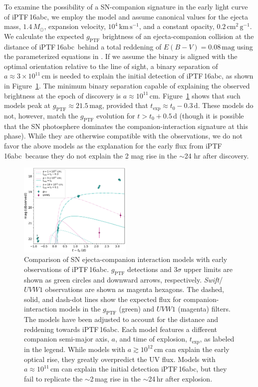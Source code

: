 \documentclass[twocolumn]{aastex61}
\newcommand{\sm}{M_\odot}
\newcommand{\abc}{iPTF\,16abc}
\begin{document}
To examine the possibility of a SN-companion signature in the early
light curve of \abc, we employ the \citet{2010ApJ...708.1025K}
model and assume canonical values for the ejecta mass, $1.4\,\sm$, expansion velocity, $10^{4}\,\textrm{km}\,\textrm{s}^{-1}$, and a constant opacity, $0.2\,\textrm{cm}^2\,\textrm{g}^{-1}$. We calculate the expected $g_\mathrm{PTF}$ brightness of an ejecta-companion collision at the distance of \abc\ behind a total reddening of $E(B-V) = 0.08 \, \mathrm{mag}$ using the parameterized equations in \citet{2012ApJ...749...18B}. If we assume the binary is aligned with the optimal orientation relative to the line of sight, a binary separation of $a \approx 3 \times 10^{11}\, \mathrm{cm}$ is needed to explain the initial detection of \abc, as shown in Figure~\ref{fig:SN-companion}.  The minimum binary separation capable of explaining the observed brightness at the epoch of discovery is $a \approx 10^{11} \, \mathrm{cm}$. Figure~\ref{fig:SN-companion} shows that such models peak at $g_\mathrm{PTF} \approx 21.5 \, \mathrm{mag}$, provided that $t_\mathrm{exp} \approx t_0 - 0.3 \, \mathrm{d}$. These models do not, however, match the $g_\mathrm{PTF}$ evolution for $t > t_0 + 0.5 \, \mathrm{d}$ (though it is possible that the SN photosphere dominates the companion-interaction signature at this phase). While they are otherwise compatible with the observations, we do not favor the above models as the explanation for the early flux from \abc\ because they do not explain the 2 mag rise in the $\sim$24 hr after discovery.

\begin{figure}[!thb]
  \centering
  \includegraphics[width=0.48\textwidth]{companion_lc.pdf}
  \caption{Comparison of SN ejecta-companion interaction models 
  with early observations of \abc. $g_\mathrm{PTF}$ 
  detections and 3$\sigma$ upper limits are shown 
  as green circles and downward arrows, respectively. 
  \textit{Swift}/$UVW1$ observations are shown as magenta hexagons.
  The dashed, solid, and dash-dot lines show the expected flux 
  for companion-interaction models in the $g_\mathrm{PTF}$ (green) 
  and $UVW1$ (magenta) filters. The models have been adjusted to 
  account for the distance and reddening towards \abc. Each 
  model features a different companion semi-major axis, $a$, and 
  time of explosion, $t_\mathrm{exp}$, as labeled in the 
  legend. While models with $a \gtrsim 10^{12} \, \mathrm{cm}$ can 
  explain the early optical rise, they greatly 
  overpredict the UV flux. Models with $a \approx 10^{11} \, 
  \mathrm{cm}$ can explain the initial detection \abc, but they 
  fail to replicate the $\sim$2\,mag rise in the $\sim$24\,hr 
  after explosion.
  }
  \label{fig:SN-companion}
\end{figure}
\end{document}
